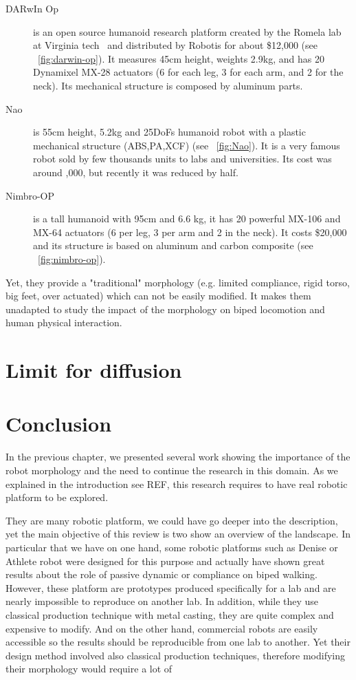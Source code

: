 \begin{description}
    \item[DARwIn Op] is an open source humanoid research platform created by the Romela lab at Virginia tech~\parencite{ha2011development} and distributed by Robotis for about \$12,000 (see \figurename~\ref{fig:darwin-op}). It measures 45cm height, weights 2.9kg, and has 20 Dynamixel MX-28 actuators (6 for each leg, 3 for each arm, and 2 for the neck). Its mechanical structure is composed by aluminum parts.
    \item[Nao] is 55cm height, 5.2kg and 25DoFs humanoid robot with a plastic mechanical structure (ABS,PA,XCF) (see \figurename~\ref{fig:Nao}). It is a very famous robot sold by few thousands units to labs and universities. Its cost was around ,000, but recently it was reduced by half.
    \item[Nimbro-OP] is a tall humanoid with 95cm and 6.6 kg, it has 20 powerful MX-106 and MX-64 actuators (6 per leg, 3 per arm and 2 in the neck). It costs \$20,000 and its structure is based on aluminum and carbon composite (see \figurename~\ref{fig:nimbro-op}).
\end{description}

Yet, they provide a "traditional" morphology (e.g. limited compliance, rigid torso, big feet, over actuated) which can not be easily modified. It makes them unadapted to study the impact of the morphology on biped locomotion and human physical interaction.

\section{Limit for diffusion} %


\section{Conclusion}

In the previous chapter, we presented several work showing the importance of the robot morphology and the need to continue the research in this domain. As we explained in the introduction see REF, this research requires to have real robotic platform to be explored.

They are many robotic platform, we could have go deeper into the description, yet the main objective of this review is two show an overview of the landscape. In particular that we have on one hand, some robotic platforms such as Denise or Athlete robot were designed for this purpose and actually have shown great results about the role of passive dynamic or compliance on biped walking. However, these platform are prototypes produced specifically for a lab and are nearly impossible to reproduce on another lab.
In addition, while they use classical production technique with metal casting, they are quite complex and expensive to modify.
And on the other hand, commercial robots are easily accessible so the results should be reproducible from one lab to another. Yet their design method involved also classical production techniques, therefore modifying their morphology would require a lot of

